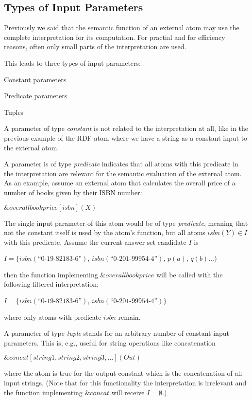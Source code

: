 \documentclass[a4paper, titlepage]{article}
\newcommand{\mi}[1]{\mathit{#1}}
\newcommand{\amp}[1]{\ensuremath{\&{\mathit{#1}}}}
\newcommand{\ext}[3]{\ensuremath{\&{\mathit{#1}}[#2](#3)}}
\newcommand\mycenterline[1]{\par\smallskip\centerline{#1} \smallskip}
\begin{document}
\subsection{Types of Input Parameters}
\label{inputparamtypes}

Previously we said that the semantic function of an external atom
may use the complete interpretation for its computation.
For practial and for efficiency reasons,
often only small parts of the interpretation are used.

This leads to three types of input parameters: 
\begin{compactitem}
\item Constant parameters
\item Predicate parameters
\item Tuples
\end{compactitem}

A parameter of type \emph{constant} is not related to the 
interpretation at all, like in the previous example of the 
RDF-atom where we have a string as a constant input to the external atom. 

A parameter is of type \emph{predicate} indicates that 
all atoms with this predicate in the interpretation are 
relevant for the semantic evaluation of the external atom.
%
%
As an example, assume an external 
atom that calculates the overall price of a number of books 
given by their ISBN number:
\mycenterline{$\ext{overallbookprice}{isbn}{X}$}
The single input parameter of this atom would be of type 
\emph{predicate}, meaning that not the constant itself is 
used by the atom's function,
but all atoms $\mi{isbn}(Y) \in I$ with this predicate.
Assume the current answer set candidate $I$ is
\mycenterline{$I = \{ \mi{isbn}(\textit{``0-19-82183-6''})$,
  $\mi{isbn}(\textit{``0-201-99954-4''})$, $p(a)$, $q(b) \dots\}$}
\noindent
then the function implementing $\amp{overallbookprice}$
will be called with the following filtered interpretation:
\mycenterline{$I = \{ \mi{isbn}(\textit{``0-19-82183-6''})$,
  $\mi{isbn}(\textit{``0-201-99954-4''}) \}$}
\noindent
where only atoms with predicate $\mi{isbn}$ remain.

A parameter of type \emph{tuple} stands for
an arbitrary number of constant input parameters.
This is, e.g., useful for string operations like concatenation
\mycenterline{$\ext{concat}{string1, string2, string3, \dots}{Out}$}
\noindent
where the atom is true for the output constant
which is the concatenation of all input strings.
(Note that for this functionality the interpretation is irrelevant
and the function implementing $\amp{concat}$ will receive $I=\emptyset$.)
\end{document}
